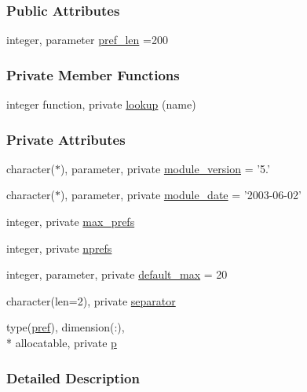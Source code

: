\subsubsection*{Public Attributes}
\begin{DoxyCompactItemize}
\item 
integer, parameter \hyperlink{classprefs_a7290161561ea5360d0049f36d9d3a31a}{pref\-\_\-len} =200
\end{DoxyCompactItemize}
\subsubsection*{Private Member Functions}
\begin{DoxyCompactItemize}
\item 
integer function, private \hyperlink{classprefs_ad3a9961606922da52f12fb6925eec0f4}{lookup} (name)
\end{DoxyCompactItemize}
\subsubsection*{Private Attributes}
\begin{DoxyCompactItemize}
\item 
character($\ast$), parameter, private \hyperlink{classprefs_ad2051574c1463f3afbaa9e30a3d5e949}{module\-\_\-version} = '5.'
\item 
character($\ast$), parameter, private \hyperlink{classprefs_af7026defbec1b9911edcde14c353a552}{module\-\_\-date} = '2003-\/06-\/02'
\item 
integer, private \hyperlink{classprefs_ac12163b65e6c96eb7f3506534cf091cc}{max\-\_\-prefs}
\item 
integer, private \hyperlink{classprefs_a0ae14163593a41361d0245ccea2a8e9c}{nprefs}
\item 
integer, parameter, private \hyperlink{classprefs_a3a5165d61eda7d30ca6fbdbbc9d44594}{default\-\_\-max} = 20
\item 
character(len=2), private \hyperlink{classprefs_aec9daa91ee7459076a1ab3ee3cd03fcf}{separator}
\item 
type(\hyperlink{structprefs_1_1pref}{pref}), dimension(\-:), \\*
allocatable, private \hyperlink{classprefs_a531c04d9846e2077ada85bba64d0f54e}{p}
\end{DoxyCompactItemize}


\subsubsection{Detailed Description}


